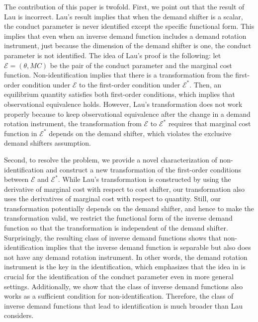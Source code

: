 \documentclass[11pt, a4paper]{article}
\theoremstyle{remark}
\begin{document}
The contribution of this paper is twofold.
First, we point out that the result of Lau is incorrect.
Lau's result implies that when the demand shifter is a scalar, the conduct parameter is never identified except the specific functional form.
This implies that even when an inverse demand function includes a demand rotation instrument, just because the dimension of the demand shifter is one, the conduct parameter is not identified.
The idea of Lau's proof is the following: let $\mathcal{E} = (\theta, MC)$ be the pair of the conduct parameter and the marginal cost function.
Non-identification implies that there is a transformation from the first-order condition under $\mathcal{E}$ to the first-order condition under $\mathcal{E}^{*}$.
Then, an equilibrium quantity satisfies both first-order conditions, which implies that observational equivalence holds.
However, Lau's transformation does not work properly because to keep observational equivalence after the change in a demand rotation instrument, the transformation from $\mathcal{E}$ to $\mathcal{E}^{*}$ requires that marginal cost function in $\mathcal{E}^{*}$ depends on the demand shifter, which violates the exclusive demand shifters assumption.

Second, to resolve the problem, we provide a novel characterization of non-identification and construct a new transformation of the first-order conditions between $\mathcal{E}$ and $\mathcal{E}^{*}$.
While Lau's transformation is constructed by using the derivative of marginal cost with respect to cost shifter, our transformation also uses the derivatives of marginal cost with respect to quantity.
Still, our transformation potentially depends on the demand shifter, and hence to make the transformation valid, we restrict the functional form of the inverse demand function so that the transformation is independent of the demand shifter.
Surprisingly, the resulting class of inverse demand functions shows that non-identification implies that the inverse demand function is separable but also does not have any demand rotation instrument.
In other words, the demand rotation instrument is the key in the identification, which emphasizes that the idea in \citet{bresnahan1982oligopoly} is crucial for the identification of the conduct parameter even in more general settings. 
Additionally, we show that the class of inverse demand functions also works as a sufficient condition for non-identification.
Therefore, the class of inverse demand functions that lead to identification is much broader than Lau considers.
\end{document}
